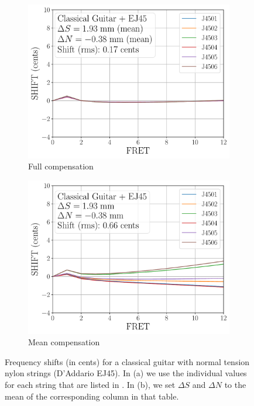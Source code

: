  \begin{figure}
  \centering
  \begin{subfigure}[b]{0.8\textwidth}
   \centering
   \includegraphics[width=5.0in]{../figures/shift_classicalguitar_ej45_full}
   \caption{Full compensation}
   \label{fig:shift_classicalguitar_ej45_full}
  \end{subfigure}
  \par\vspace{0.25in}
  \begin{subfigure}[b]{0.8\textwidth}
   \centering
   \includegraphics[width=5.0in]{../figures/shift_classicalguitar_ej45_mean}
   \caption{Mean compensation}
   \label{fig:shift_classicalguitar_ej45_mean}
  \end{subfigure}
  \caption{\label{fig:compensation_classicalguitar_ej45} Frequency shifts (in cents) for a classical guitar with normal tension nylon strings (D'Addario EJ45). In (a) we use the individual values for each string that are listed in . In (b), we set $\Delta S$ and $\Delta N$ to the mean of the corresponding column in that table.}
 \end{figure}

